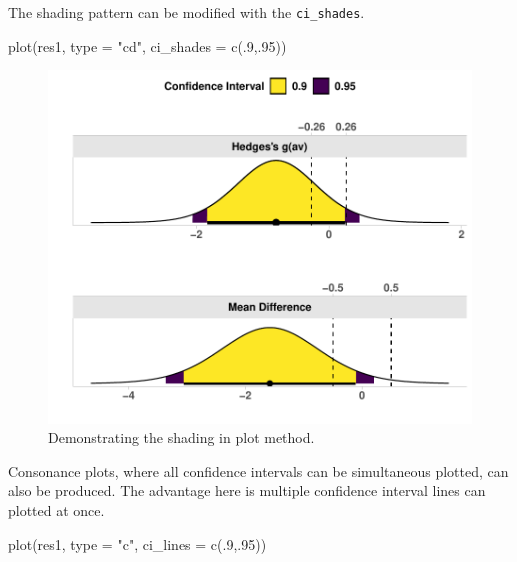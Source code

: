\documentclass[
]{interact}
\newenvironment{Shaded}{\begin{snugshade}}{\end{snugshade}}
\newcommand{\AttributeTok}[1]{\textcolor[rgb]{0.40,0.45,0.13}{#1}}
\newcommand{\DecValTok}[1]{\textcolor[rgb]{0.68,0.00,0.00}{#1}}
\newcommand{\FunctionTok}[1]{\textcolor[rgb]{0.28,0.35,0.67}{#1}}
\newcommand{\NormalTok}[1]{\textcolor[rgb]{0.00,0.23,0.31}{#1}}
\newcommand{\StringTok}[1]{\textcolor[rgb]{0.13,0.47,0.30}{#1}}
\begin{document}
\newpage

The shading pattern can be modified with the \texttt{ci\_shades}.

\begin{Shaded}
\begin{Highlighting}[]
\FunctionTok{plot}\NormalTok{(res1, }\AttributeTok{type =} \StringTok{"cd"}\NormalTok{,}
     \AttributeTok{ci\_shades =} \FunctionTok{c}\NormalTok{(.}\DecValTok{9}\NormalTok{,.}\DecValTok{95}\NormalTok{))}
\end{Highlighting}
\end{Shaded}

\begin{figure}[H]

{\centering \includegraphics{avocado-quarto_files/figure-pdf/shadeplot-1.pdf}

}

\caption{Demonstrating the shading in plot method.}

\end{figure}

\newpage

Consonance plots, where all confidence intervals can be simultaneous
plotted, can also be produced. The advantage here is multiple confidence
interval lines can plotted at once.

\begin{Shaded}
\begin{Highlighting}[]
\FunctionTok{plot}\NormalTok{(res1, }\AttributeTok{type =} \StringTok{"c"}\NormalTok{,}
     \AttributeTok{ci\_lines =}  \FunctionTok{c}\NormalTok{(.}\DecValTok{9}\NormalTok{,.}\DecValTok{95}\NormalTok{))}
\end{Highlighting}
\end{Shaded}
\end{document}

